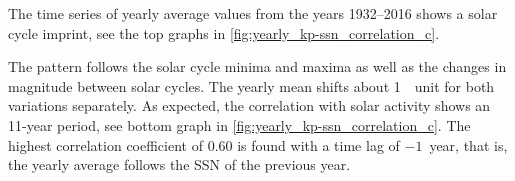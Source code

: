 The time series of yearly average \Kp{} values from the years 1932--2016 shows a solar cycle imprint, see the top graphs in \autoref{fig:yearly_kp-ssn_correlation_c}.
\begin{figure}
\end{figure}
The \Kp{} pattern follows the solar cycle minima and maxima as well as the changes in magnitude between solar cycles. The yearly mean \Kp{} shifts about 1~\Kp~unit for both variations separately. As expected, the correlation with solar activity shows an 11-year period, see bottom graph in \autoref{fig:yearly_kp-ssn_correlation_c}. The highest correlation coefficient of 0.60 is found with a time lag of $-1$~year, that is, the yearly average \Kp{} follows the SSN of the previous year.

